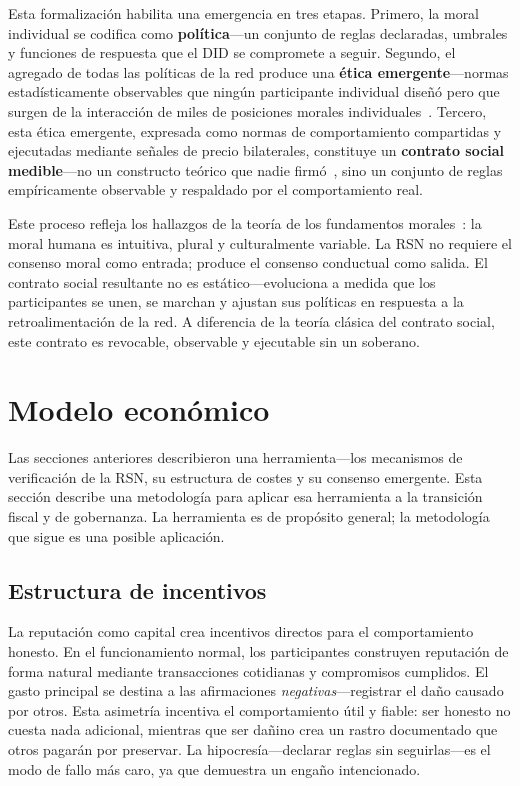 \documentclass[11pt,a4paper,twocolumn]{article}
\begin{document}
Esta formalización habilita una emergencia en tres etapas. Primero, la moral individual se codifica como \textbf{política}---un conjunto de reglas declaradas, umbrales y funciones de respuesta que el DID se compromete a seguir. Segundo, el agregado de todas las políticas de la red produce una \textbf{ética emergente}---normas estadísticamente observables que ningún participante individual diseñó pero que surgen de la interacción de miles de posiciones morales individuales~\cite{durkheim1893}. Tercero, esta ética emergente, expresada como normas de comportamiento compartidas y ejecutadas mediante señales de precio bilaterales, constituye un \textbf{contrato social medible}---no un constructo teórico que nadie firmó~\cite{rawls1971}, sino un conjunto de reglas empíricamente observable y respaldado por el comportamiento real.

Este proceso refleja los hallazgos de la teoría de los fundamentos morales~\cite{haidt2012}: la moral humana es intuitiva, plural y culturalmente variable. La RSN no requiere el consenso moral como entrada; produce el consenso conductual como salida. El contrato social resultante no es estático---evoluciona a medida que los participantes se unen, se marchan y ajustan sus políticas en respuesta a la retroalimentación de la red. A diferencia de la teoría clásica del contrato social, este contrato es revocable, observable y ejecutable sin un soberano.

\section{Modelo económico}

Las secciones anteriores describieron una herramienta---los mecanismos de verificación de la RSN, su estructura de costes y su consenso emergente. Esta sección describe una metodología para aplicar esa herramienta a la transición fiscal y de gobernanza. La herramienta es de propósito general; la metodología que sigue es una posible aplicación.

\subsection{Estructura de incentivos}

La reputación como capital crea incentivos directos para el comportamiento honesto. En el funcionamiento normal, los participantes construyen reputación de forma natural mediante transacciones cotidianas y compromisos cumplidos. El gasto principal se destina a las afirmaciones \emph{negativas}---registrar el daño causado por otros. Esta asimetría incentiva el comportamiento útil y fiable: ser honesto no cuesta nada adicional, mientras que ser dañino crea un rastro documentado que otros pagarán por preservar. La hipocresía---declarar reglas sin seguirlas---es el modo de fallo más caro, ya que demuestra un engaño intencionado.
\end{document}
